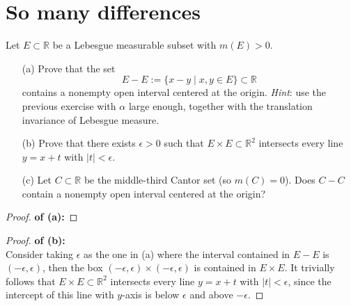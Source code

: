 \documentclass[lang=cn,11pt]{elegantbook}
\begin{document}
\section{So many differences}
  Let $E\subset\mathbb{R}$ be a Lebesgue measurable subset with $m(E)>0$.
  \begin{itemize}
  \item[(a)]
    Prove that the set
    \[
      E-E:=\{x-y\mid x,y\in E\}\subset\mathbb{R}
    \]
    contains a nonempty open interval centered at the
    origin. \textit{Hint}: use the previous exercise with $\alpha$
    large enough, together with the translation invariance of Lebesgue
    measure.
  \item[(b)]
    Prove that there exists $\epsilon>0$ such that $E\times E\subset\mathbb{R}^2$ intersects every line $y=x+t$ with $|t|<\epsilon$.
  \item[(c)]
    Let $C\subset\mathbb{R}$ be the middle-third Cantor set (so $m(C)=0$). Does $C-C$ contain a nonempty open interval centered at the origin?
  \end{itemize}  
\begin{proof}
\textbf{of (a): }
\end{proof}

\begin{proof}
    \textbf{of (b):}\\
    Consider taking $\epsilon$ as the one in (a) where the interval contained in $E-E$ is $(-\epsilon, \epsilon)$, then the box $(-\epsilon, \epsilon) \times (-\epsilon, \epsilon)$ is contained in $E\times E$. It trivially follows that $E\times E\subset\mathbb{R}^2$ intersects every line $y=x+t$ with $|t|<\epsilon$, since the intercept of this line with $y$-axis is below $\epsilon$ and above $-\epsilon$.
\end{proof}
\end{document}

